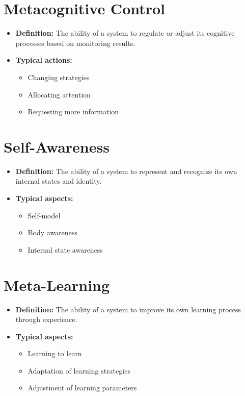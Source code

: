 \documentclass[a4paper]{article}
\begin{document}
    
    \section{Metacognitive Control}
    \begin{itemize}
        \item \textbf{Definition:} The ability of a system to regulate or adjust its cognitive processes based on monitoring results.
        \item \textbf{Typical actions:}
        \begin{itemize}
            \item Changing strategies
            \item Allocating attention
            \item Requesting more information
        \end{itemize}
    \end{itemize}
    
    
    \section{Self-Awareness}
    \begin{itemize}
        \item \textbf{Definition:} The ability of a system to represent and recognize its own internal states and identity.
        \item \textbf{Typical aspects:}
        \begin{itemize}
            \item Self-model
            \item Body awareness
            \item Internal state awareness
        \end{itemize}
    \end{itemize}
    
    
    \section{Meta-Learning}
    \begin{itemize}
        \item \textbf{Definition:} The ability of a system to improve its own learning process through experience.
        \item \textbf{Typical aspects:}
        \begin{itemize}
            \item Learning to learn
            \item Adaptation of learning strategies
            \item Adjustment of learning parameters
        \end{itemize}
    \end{itemize}
    
\end{document}
